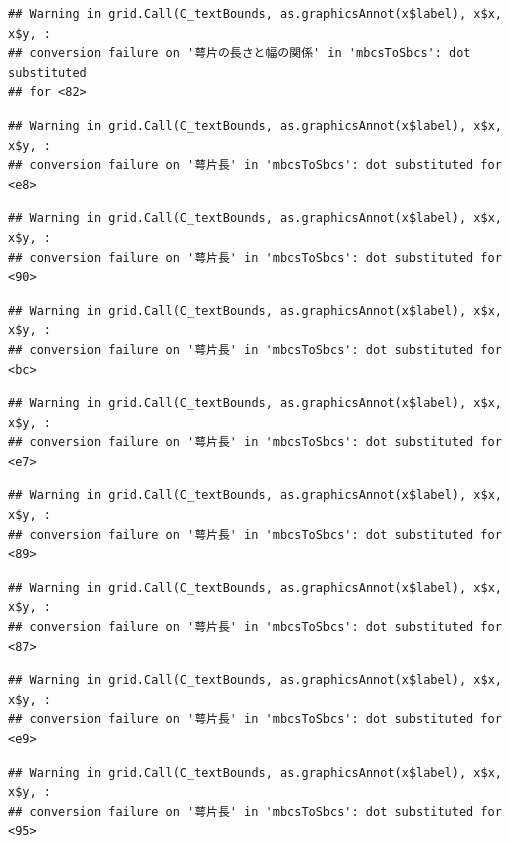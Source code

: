 \documentclass[
]{book}
\begin{document}
\begin{verbatim}
## Warning in grid.Call(C_textBounds, as.graphicsAnnot(x$label), x$x, x$y, :
## conversion failure on '萼片の長さと幅の関係' in 'mbcsToSbcs': dot substituted
## for <82>
\end{verbatim}

\begin{verbatim}
## Warning in grid.Call(C_textBounds, as.graphicsAnnot(x$label), x$x, x$y, :
## conversion failure on '萼片長' in 'mbcsToSbcs': dot substituted for <e8>
\end{verbatim}

\begin{verbatim}
## Warning in grid.Call(C_textBounds, as.graphicsAnnot(x$label), x$x, x$y, :
## conversion failure on '萼片長' in 'mbcsToSbcs': dot substituted for <90>
\end{verbatim}

\begin{verbatim}
## Warning in grid.Call(C_textBounds, as.graphicsAnnot(x$label), x$x, x$y, :
## conversion failure on '萼片長' in 'mbcsToSbcs': dot substituted for <bc>
\end{verbatim}

\begin{verbatim}
## Warning in grid.Call(C_textBounds, as.graphicsAnnot(x$label), x$x, x$y, :
## conversion failure on '萼片長' in 'mbcsToSbcs': dot substituted for <e7>
\end{verbatim}

\begin{verbatim}
## Warning in grid.Call(C_textBounds, as.graphicsAnnot(x$label), x$x, x$y, :
## conversion failure on '萼片長' in 'mbcsToSbcs': dot substituted for <89>
\end{verbatim}

\begin{verbatim}
## Warning in grid.Call(C_textBounds, as.graphicsAnnot(x$label), x$x, x$y, :
## conversion failure on '萼片長' in 'mbcsToSbcs': dot substituted for <87>
\end{verbatim}

\begin{verbatim}
## Warning in grid.Call(C_textBounds, as.graphicsAnnot(x$label), x$x, x$y, :
## conversion failure on '萼片長' in 'mbcsToSbcs': dot substituted for <e9>
\end{verbatim}

\begin{verbatim}
## Warning in grid.Call(C_textBounds, as.graphicsAnnot(x$label), x$x, x$y, :
## conversion failure on '萼片長' in 'mbcsToSbcs': dot substituted for <95>
\end{verbatim}
\end{document}
